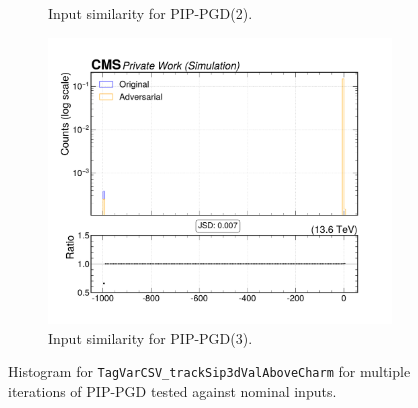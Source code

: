 \begin{figure}[htbp]
\begin{subfigure}[t]{0.32\textwidth}
    \caption*{Input similarity for PIP-PGD(2).}
  \end{subfigure}\hfill
  \begin{subfigure}[t]{0.32\textwidth}
    \includegraphics[width=\linewidth]{media/output/features/compare/combined_it_3/cmp_global_features_TagVarCSV_trackSip3dValAboveCharm.pdf}
    \caption*{Input similarity for PIP-PGD(3).}
  \end{subfigure}

  \caption*{Histogram for \texttt{TagVarCSV\_trackSip3dValAboveCharm} for multiple iterations of PIP-PGD tested against nominal inputs.}
  \label{fig:combined_input_TagVarCSV_trackSip3dValAboveCharm}
\end{figure}

